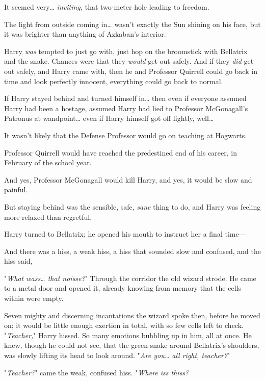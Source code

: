 It seemed very{\ldots} \emph{inviting,} that two-meter hole leading to freedom.

The light from outside coming in{\ldots} wasn't exactly the Sun shining on his 
face, but it was brighter than anything of Azkaban's interior.

Harry \emph{was} tempted to just go with, just hop on the broomstick with 
Bellatrix and the snake. Chances were that they \emph{would} get out safely. 
And if they \emph{did} get out safely, and Harry came with, then he and 
Professor Quirrell could go back in time and look perfectly innocent, 
everything could go back to normal.

If Harry stayed behind and turned himself in{\ldots} then even if everyone 
assumed Harry had been a hostage, assumed Harry had lied to Professor 
McGonagall's Patronus at wandpoint{\ldots} even if Harry himself got off 
lightly, well{\ldots}

It wasn't likely that the Defense Professor would go on teaching at Hogwarts.

Professor Quirrell would have reached the predestined end of his career, in 
February of the school year.

And yes, Professor McGonagall would kill Harry, and yes, it would be slow and 
painful.

But staying behind was the sensible, safe, \emph{sane} thing to do, and Harry 
was feeling more relaxed than regretful.

Harry turned to Bellatrix; he opened his mouth to instruct her a final time---

And there was a hiss, a weak hiss, a hiss that sounded slow and confused, and 
the hiss said,

"\emph{What wass{\ldots} that noisse?}"
\sbreak
Through the corridor the old wizard strode. He came to a metal door and opened 
it, already knowing from memory that the cells within were empty.

Seven mighty and discerning incantations the wizard spoke then, before he moved 
on; it would be little enough exertion in total, with so few cells left to 
check.
\sbreak
"\emph{Teacher,}" Harry hissed. So many emotions bubbling up in him, all at 
once. He knew, though he could not see, that the green snake around Bellatrix's 
shoulders, was slowly lifting its head to look around. "\emph{Are you{\ldots} 
all right, teacher?}"

"\emph{Teacher?}" came the weak, confused hiss. "\emph{Where iss thiss?} 

